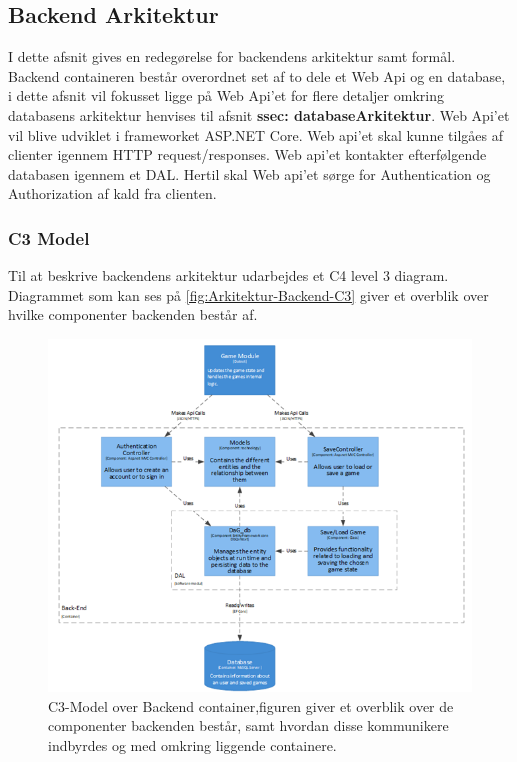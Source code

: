 \subsection{Backend Arkitektur}
\label{ssec: BackendArkitektur}
I dette afsnit gives en redegørelse for backendens arkitektur samt formål.\\ 
 
\noindent Backend containeren består overordnet set af to dele et Web Api og en database, i dette afsnit vil fokusset ligge på Web Api'et for flere detaljer omkring databasens arkitektur henvises til afsnit \textbf{ssec: databaseArkitektur}. Web Api'et vil blive udviklet i frameworket ASP.NET Core. Web api'et skal kunne tilgåes af clienter igennem HTTP request/responses. Web api'et kontakter efterfølgende databasen igennem et DAL. Hertil skal Web api'et sørge for Authentication og Authorization af kald fra clienten.\\

\subsubsection{C3 Model}

\noindent Til at beskrive backendens arkitektur udarbejdes et C4 level 3 diagram. Diagrammet som kan ses på \autoref{fig:Arkitektur-Backend-C3} giver et overblik over hvilke componenter backenden består af.
 
\begin{figure}[H]
\centering
\includegraphics[width = \textwidth]{02-Body/Images/Backend_C3.PNG}
\caption{C3-Model over Backend container,figuren giver et overblik over de componenter backenden består, samt hvordan disse kommunikere indbyrdes og med omkring liggende containere.}
\label{fig:Arkitektur-Backend-C3}
\end{figure}

